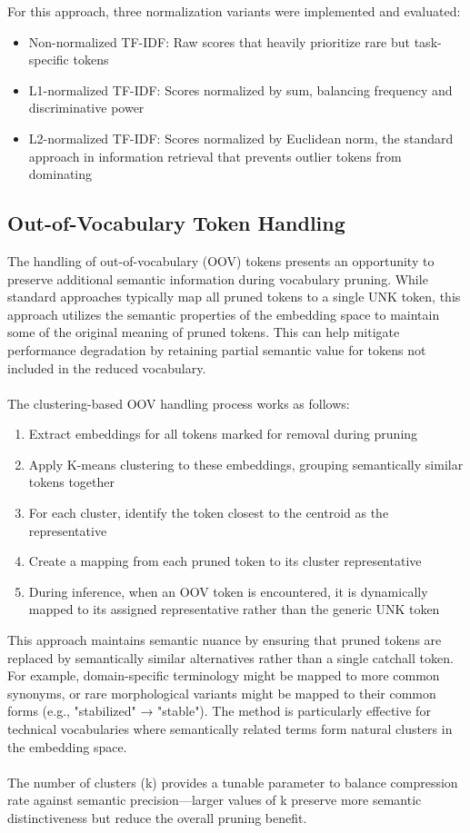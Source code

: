 \documentclass[twocolumn]{article}
\begin{document}
For this approach, three normalization variants were implemented and evaluated:
\begin{itemize}
    \item Non-normalized TF-IDF: Raw scores that heavily prioritize rare but task-specific tokens
    \item L1-normalized TF-IDF: Scores normalized by sum, balancing frequency and discriminative power
    \item L2-normalized TF-IDF: Scores normalized by Euclidean norm, the standard approach in information retrieval that prevents outlier tokens from dominating
\end{itemize}
\subsection{Out-of-Vocabulary Token Handling}
The handling of out-of-vocabulary (OOV) tokens presents an opportunity to preserve additional semantic information during vocabulary pruning. While standard approaches typically map all pruned tokens to a single UNK token, this approach utilizes the semantic properties of the embedding space to maintain some of the original meaning of pruned tokens. This can help mitigate performance degradation by retaining partial semantic value for tokens not included in the reduced vocabulary.
\\ \\
The clustering-based OOV handling process works as follows:
\begin{enumerate}
    \item Extract embeddings for all tokens marked for removal during pruning
    \item Apply K-means clustering to these embeddings, grouping semantically similar tokens together
    \item For each cluster, identify the token closest to the centroid as the representative
    \item Create a mapping from each pruned token to its cluster representative
    \item During inference, when an OOV token is encountered, it is dynamically mapped to its assigned representative rather than the generic UNK token
\end{enumerate}
This approach maintains semantic nuance by ensuring that pruned tokens are replaced by semantically similar alternatives rather than a single catchall token. For example, domain-specific terminology might be mapped to more common synonyms, or rare morphological variants might be mapped to their common forms (e.g., "stabilized" → "stable"). The method is particularly effective for technical vocabularies where semantically related terms form natural clusters in the embedding space.
\\ \\
The number of clusters (k) provides a tunable parameter to balance compression rate against semantic precision—larger values of k preserve more semantic distinctiveness but reduce the overall pruning benefit. 
\end{document}
